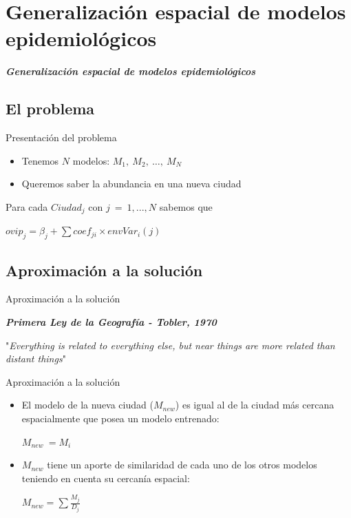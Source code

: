 \documentclass[10pt]{beamer}
\newcommand\IncrFont{\fontsize{20}{20}\selectfont}
\begin{document}
\section{Generalización espacial de modelos epidemiológicos}

\begin{frame}{}
  \IncrFont
  \begin{center}
    \textit{\textbf{Generalización espacial de modelos epidemiológicos}}
  \end{center}
\end{frame}


\subsection{El problema}


\begin{frame}{Presentación del problema}
  \begin{itemize}[<+->]
    \item Tenemos $N$ modelos: $M_{1},\ M_{2},\ \dots,\ M_{N}$
    \item Queremos saber la abundancia en una nueva ciudad
  \end{itemize}
  \pause

  Para cada $Ciudad_{j}$ con $j\ =\ 1, ..., N$ sabemos que
  \begin{center}
    $ovip_{j} = \beta_{j} + \sum{}{coef_{ji} \times envVar_{i}(j)}$
  \end{center}
\end{frame}


\subsection{Aproximación a la solución}

\begin{frame}{Aproximación a la solución}
  \begin{center}
    \fontsize{15}{15}\selectfont
    \textbf{\textit{Primera Ley de la Geografía - Tobler, 1970}}
  \end{center}
  "\textit{Everything is related to everything else, but near things are more related
  than distant things}"
\end{frame}



\begin{frame}{Aproximación a la solución}
  \begin{itemize}[<+->]
    \item El modelo de la nueva ciudad ($M_{new}$) es igual al de la ciudad más
          cercana espacialmente que posea un modelo entrenado:
          \begin{center}
            $M_{new}\ = M_{i}$
          \end{center}
    \item $M_{new}$ tiene un aporte de similaridad de cada uno de los otros modelos
          teniendo en cuenta su cercanía espacial:
          \begin{center}
            $M_{new} = \sum{}{\frac{M_{j}}{D_{j}}}$
          \end{center}
  \end{itemize}
\end{frame}
\end{document}
